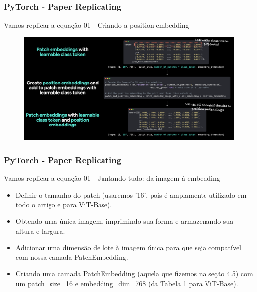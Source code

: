 \documentclass{beamer}
\begin{document}
\begin{frame}
	\frametitle{PyTorch - Paper Replicating}
	\begin{block}{Vamos replicar a equação 01 - Criando a position embedding}
		\begin{figure}
			\centering
			\includegraphics[width=1\linewidth]{figures/position_embedding_post}
		\end{figure}
		
	\end{block}
\end{frame}
\begin{frame}
	\frametitle{PyTorch - Paper Replicating}
	\begin{block}{Vamos replicar a equação 01 - Juntando tudo: da imagem à embedding}
		\begin{itemize}
			\item Definir o tamanho do patch (usaremos '16', pois é amplamente utilizado em todo o artigo e para ViT-Base).
			\item Obtendo uma única imagem, imprimindo sua forma e armazenando sua altura e largura.
			\item Adicionar uma dimensão de lote à imagem única para que seja compatível com nossa camada PatchEmbedding.
			\item Criando uma camada PatchEmbedding (aquela que fizemos na seção 4.5) com um patch\_size=16 e embedding\_dim=768 (da Tabela 1 para ViT-Base).
		\end{itemize}
		
	\end{block}
\end{frame}
\end{document}
